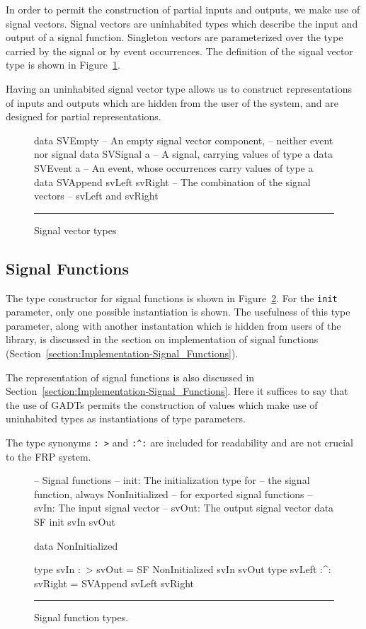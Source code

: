 In order to permit the construction of partial inputs and outputs, we make use
of signal vectors. Signal vectors are uninhabited types which describe the input
and output of a signal function. Singleton vectors are parameterized over the
type carried by the signal or by event occurrences. The definition of the signal
vector type is shown in Figure~\ref{figure:signal_vector_types}. 

Having an uninhabited signal vector type allows us to construct representations
of inputs and outputs which are hidden from the user of the system, and are
designed for partial representations.

\begin{figure}
\begin{code}
data SVEmpty    -- An empty signal vector component,
                -- neither event nor signal
data SVSignal a -- A signal, carrying values of type a
data SVEvent a  -- An event, whose occurrences carry values of type a
data SVAppend svLeft svRight -- The combination of the signal vectors
                             -- svLeft and svRight
\end{code}
\hrule
\caption{Signal vector types}
\label{figure:signal_vector_types}
\end{figure}

\subsection{Signal Functions}
\label{subsection:System_Design_and_Interface-Types-Signal_Functions}

The type constructor for signal functions is shown in
Figure~\ref{figure:signal_function_types}. For the {\tt init} parameter, only
one possible instantiation is shown. The usefulness of this type parameter,
along with another instantation which is hidden from users of the library,
is discussed in the section on implementation of signal functions
(Section~\ref{section:Implementation-Signal_Functions}).

The representation of signal functions is also discussed in
Section~\ref{section:Implementation-Signal_Functions}. Here it suffices to say
that the use of GADTs permits the construction of values which make use of
uninhabited types as instantiations of type parameters.

The type synonyms {\tt :~>} and {\tt :\textasciicircum:} are included for readability and are
not crucial to the FRP system.

\begin{figure}
\begin{code}
-- Signal functions
-- init: The initialization type for 
-- the signal function, always NonInitialized
-- for exported signal functions
-- svIn: The input signal vector
-- svOut: The output signal vector
data SF init svIn svOut

data NonInitialized

type svIn :~> svOut = SF NonInitialized svIn svOut
type svLeft :^: svRight = SVAppend svLeft svRight
\end{code}
\hrule
\caption{Signal function types.}
\label{figure:signal_function_types}
\end{figure}

